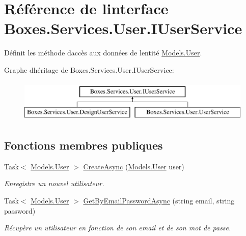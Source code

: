 \hypertarget{interface_boxes_1_1_services_1_1_user_1_1_i_user_service}{}\section{Référence de l\textquotesingle{}interface Boxes.\+Services.\+User.\+I\+User\+Service}
\label{interface_boxes_1_1_services_1_1_user_1_1_i_user_service}


Définit les méthode d\textquotesingle{}accès aux données de l\textquotesingle{}entité \hyperlink{class_boxes_1_1_models_1_1_user}{Models.\+User}.  


Graphe d\textquotesingle{}héritage de Boxes.\+Services.\+User.\+I\+User\+Service\+:\begin{figure}[H]
\begin{center}
\leavevmode
\includegraphics[height=2.000000cm]{interface_boxes_1_1_services_1_1_user_1_1_i_user_service}
\end{center}
\end{figure}
\subsection*{Fonctions membres publiques}
\begin{DoxyCompactItemize}
\item 
Task$<$ \hyperlink{class_boxes_1_1_models_1_1_user}{Models.\+User} $>$ \hyperlink{interface_boxes_1_1_services_1_1_user_1_1_i_user_service_a880f9da1dd444fda122508bf67cb46f7}{Create\+Async} (\hyperlink{class_boxes_1_1_models_1_1_user}{Models.\+User} user)
\begin{DoxyCompactList}\small\item\em Enregistre un nouvel utilisateur. \end{DoxyCompactList}\item 
Task$<$ \hyperlink{class_boxes_1_1_models_1_1_user}{Models.\+User} $>$ \hyperlink{interface_boxes_1_1_services_1_1_user_1_1_i_user_service_af1d3d64ca48c7bf548203f6fa170f9d8}{Get\+By\+Email\+Password\+Async} (string email, string password)
\begin{DoxyCompactList}\small\item\em Récupère un utilisateur en fonction de son email et de son mot de passe. \end{DoxyCompactList}\end{DoxyCompactItemize}


